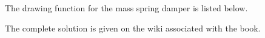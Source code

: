 The drawing function for the mass spring damper is listed below.

%


\ifsolutionmanual



\else




\fi


The complete solution is given on the wiki associated with the book.


